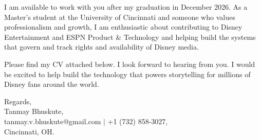 \documentclass[11pt]{letter}
\begin{document}
\begin{letter}{}
I am available to work with you after my graduation in December 2026. As a Master's student at the University of Cincinnati and someone who values professionalism and growth, I am enthusiastic about contributing to Disney Entertainment and ESPN Product \& Technology and helping build the systems that govern and track rights and availability of Disney media.

Please find my CV attached below. I look forward to hearing from you. I would be excited to help build the technology that powers storytelling for millions of Disney fans around the world.

{\setlength{\parskip}{0pt}
Regards,\\
Tanmay Bhuskute,\\
tanmay.v.bhuskute@gmail.com $\mid$ +1 (732) 858-3027,\\
Cincinnati, OH.
}

\end{letter}
\end{document}

